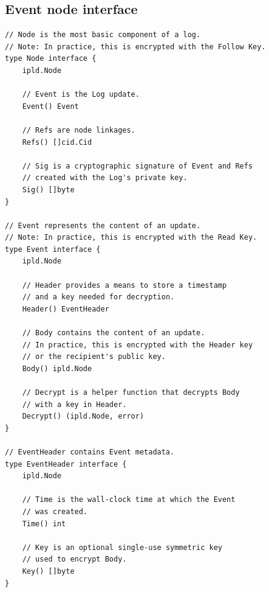 \documentclass{textile}
\begin{document}
\begin{example*}[!p]
\section{Event node interface} \label{appx:EventNode} %
\begin{lstlisting}
// Node is the most basic component of a log.
// Note: In practice, this is encrypted with the Follow Key.
type Node interface {
    ipld.Node

    // Event is the Log update.
    Event() Event

    // Refs are node linkages.
    Refs() []cid.Cid

    // Sig is a cryptographic signature of Event and Refs
    // created with the Log's private key.
    Sig() []byte
}

// Event represents the content of an update.
// Note: In practice, this is encrypted with the Read Key.
type Event interface {
    ipld.Node

    // Header provides a means to store a timestamp
    // and a key needed for decryption.
    Header() EventHeader

    // Body contains the content of an update.
    // In practice, this is encrypted with the Header key
    // or the recipient's public key.
    Body() ipld.Node

    // Decrypt is a helper function that decrypts Body
    // with a key in Header.
    Decrypt() (ipld.Node, error)
}

// EventHeader contains Event metadata.
type EventHeader interface {
    ipld.Node

    // Time is the wall-clock time at which the Event
    // was created.
    Time() int

    // Key is an optional single-use symmetric key
    // used to encrypt Body.
    Key() []byte
}
\end{lstlisting} 
\end{example*} 
\end{document}
